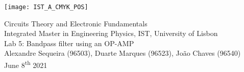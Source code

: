 \thispagestyle {empty}

\texttt{[image: IST\_A\_CMYK\_POS]}

\begin{center}

\vspace{1.0cm}

\vspace{1cm}
{\FontLb Circuits Theory and Electronic Fundamentals} \\ 
\vspace{0.5cm}
{\FontSn Integrated Master in Engineering Physics, IST, University of Lisbon} \\
\vspace{0.5cm}
{\FontSn Lab 5: Bandpass filter using an OP-AMP} \\
\vspace{0.2cm}
{\FontSn Alexandre Sequeira (96503), Duarte Marques (96523), João Chaves (96540)} \\
\vspace{0.2cm}
{\FontSn June 8\textsuperscript{th} 2021} \\ %
%
\end{center}

